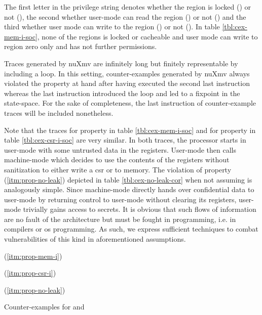 \begin{example}
    The first letter in the privilege string denotes whether the region is locked () or not (\minrv{-}), the second whether user-mode can read the region () or not (\minrv{-}) and the third whether user mode can write to the region () or not (\minrv{-}).
    In table \ref{tbl:cex-mem-i-soc}, none of the regions is locked or cacheable and user mode can write to region zero only and has not further permissions.

    Traces generated by nuXmv are infinitely long but finitely representable by including a loop.
    In this setting, counter-examples generated by nuXmv always violated the property at hand after having executed the second last instruction whereas the last instruction introduced the loop and led to a fixpoint in the state-space.
    For the sake of completeness, the last instruction of counter-example traces will be included nonetheless.
\end{example}

Note that the traces for property  in table \ref{tbl:cex-mem-i-soc} and for property  in table \ref{tbl:cex-csr-i-soc} are very similar.
In both traces, the processor starts in user-mode with some untrusted data in the registers.
User-mode then calls machine-mode which decides to use the contents of the registers without sanitization to either write a \gls{csr} or to memory.
The violation of property  (\ref{itm:prop-no-leak}) depicted in table \ref{tbl:cex-no-leak-cor} when not assuming  is analogously simple.
Since machine-mode directly hands over confidential data to user-mode by returning control to user-mode without clearing its registers, user-mode trivially gains access to secrets.
It is obvious that such flows of information are no fault of the architecture but must be fought in programming, i.e. in compilers or \gls{os} programming.
As such, we express sufficient techniques to combat vulnerabilities of this kind in aforementioned assumptions.

\begin{table}
    \begin{subtable}{\textwidth}
        \centering
        
        \caption{ (\ref{itm:prop-mem-i})}
        \label{tbl:cex-mem-i-soc}
    \end{subtable}

    \begin{subtable}{\textwidth}
        \centering
        
        \caption{ (\ref{itm:prop-csr-i})}
        \label{tbl:cex-csr-i-soc}
    \end{subtable}

    \begin{subtable}{\textwidth}
        \centering
        
        \caption{ (\ref{itm:prop-no-leak})}
        \label{tbl:cex-no-leak-cor}
    \end{subtable}
    \caption{Counter-examples for  and }
\end{table}

